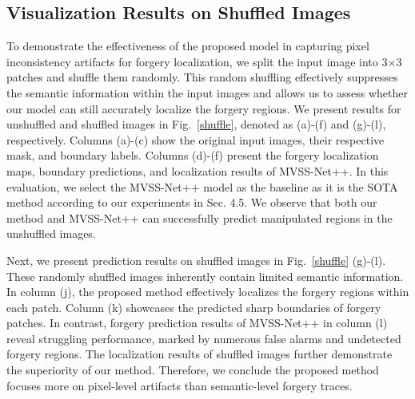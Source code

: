 \documentclass[10pt,journal,compsoc]{IEEEtran}
\begin{document}
\subsection{Visualization Results on Shuffled Images}
To demonstrate the effectiveness of the proposed model in capturing pixel inconsistency artifacts for forgery localization, we split the input image into 3$\times$3 patches and shuffle them randomly. This random shuffling effectively suppresses the semantic information within the input images and allows us to assess whether our model can still accurately localize the forgery regions. We present results for unshuffled and shuffled images in Fig.~\ref{shuffle}, denoted as (a)-(f) and (g)-(l), respectively. Columns (a)-(c) show the original input images, their respective mask, and boundary labels. 
Columns (d)-(f) present the forgery localization maps, boundary predictions, and localization results of MVSS-Net++. In this evaluation, we select the MVSS-Net++ model as the baseline as it is the SOTA method according to our experiments in Sec. 4.5. We observe that both our method and MVSS-Net++ can successfully predict manipulated regions in the unshuffled images. 

Next, we present  prediction results on shuffled images in Fig.~\ref{shuffle} (g)-(l). These randomly shuffled images inherently contain limited semantic information. In column (j), the proposed method effectively localizes the forgery regions within each patch. Column (k) showcases the predicted sharp boundaries of forgery patches. In contrast, forgery prediction results of MVSS-Net++ in column (l) reveal struggling performance, marked by numerous false alarms and undetected forgery regions. The localization results of shuffled images further demonstrate the superiority of our method. Therefore, we conclude the proposed method focuses more on pixel-level artifacts than semantic-level forgery traces.



\end{document}
